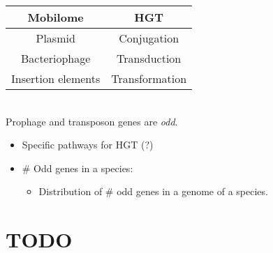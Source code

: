 \documentclass[10pt,a4paper]{article}
\theoremstyle{plain} \newtheorem{Lem}{Lemma}
\begin{document}
\begin{tabular}{|c|c|}
\hline Mobilome & HGT \\
\hline
\hline Plasmid & Conjugation \\
\hline Bacteriophage & Transduction \\
\hline Insertion elements & Transformation \\
\hline
\end{tabular}
\\


Prophage and transposon genes are {\em odd}.


\Questions
\begin{itemize}
  \item Specific pathways for HGT (?)
  \item \# Odd genes in a species:
    \begin{itemize}
  	  \item Distribution of \# odd genes in a genome of a species.
    \end{itemize}
\end{itemize}



\section{TODO}
\end{document}

